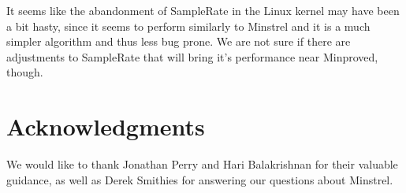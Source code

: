 \documentclass[letterpaper,twocolumn,10pt]{article}
\begin{document}
It seems like the abandonment of SampleRate in the Linux kernel may have been a bit hasty, since it seems to perform similarly to Minstrel and it is a much simpler algorithm and thus less bug prone. We are not sure if there are adjustments to SampleRate that will bring it's performance near Minproved, though. 

\section{Acknowledgments}
We would like to thank Jonathan Perry and Hari Balakrishnan for their valuable guidance, as well as Derek Smithies for answering our questions about Minstrel. 


{\footnotesize 
}
\end{document}
